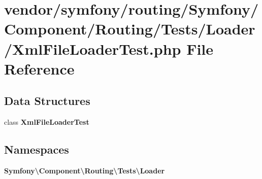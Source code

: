\section{vendor/symfony/routing/\+Symfony/\+Component/\+Routing/\+Tests/\+Loader/\+Xml\+File\+Loader\+Test.php File Reference}
\label{_xml_file_loader_test_8php}
\subsection*{Data Structures}
\begin{DoxyCompactItemize}
\item 
class {\bf Xml\+File\+Loader\+Test}
\end{DoxyCompactItemize}
\subsection*{Namespaces}
\begin{DoxyCompactItemize}
\item 
 {\bf Symfony\textbackslash{}\+Component\textbackslash{}\+Routing\textbackslash{}\+Tests\textbackslash{}\+Loader}
\end{DoxyCompactItemize}

